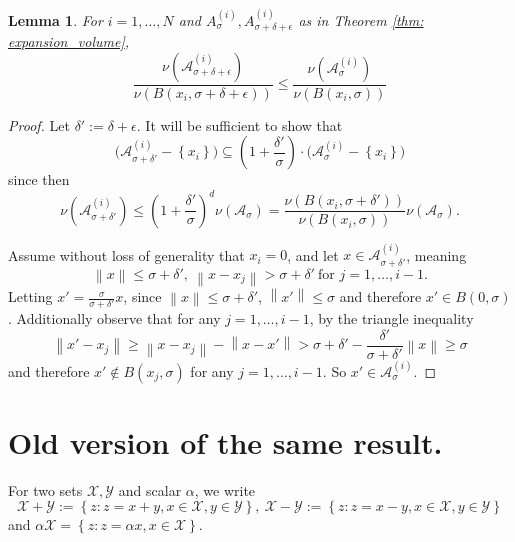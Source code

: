 \documentclass{article}
\newcommand{\norm}[1]{\left\lVert#1\right\rVert}
\newcommand{\set}[1]{\left\{#1\right\}}
\newcommand{\Aset}{\mathcal{A}}
\newcommand{\Asig}{\Aset_{\sigma}}
\newcommand{\1}{\mathbf{1}}
\theoremstyle{alden}
\theoremstyle{aldenthm}
\newtheorem{lemma}{Lemma}
\theoremstyle{remark}
\begin{document}
\begin{lemma}
	\label{lem: covering}
	For $i = 1, \ldots, N$ and  $A_{\sigma}^{(i)}, A_{\sigma + \delta + \epsilon}^{(i)}$ as in Theorem \ref{thm: expansion_volume},
	\begin{equation*}
	\frac{\nu(\Aset_{\sigma + \delta + \epsilon}^{(i)})}{\nu(B(x_i, \sigma + \delta + \epsilon))} \leq \frac{\nu(\Aset_{\sigma}^{(i)})}{\nu(B(x_i, \sigma))}
	\end{equation*}
\end{lemma}
\begin{proof}
	Let $\delta' := \delta + \epsilon$. It will be sufficient to show that
	\begin{equation*}
	\biggl(\Aset_{\sigma + \delta'}^{(i)} - \set{x_i}\biggr) \subseteq \left(1 + \frac{\delta'}{\sigma}\right)\cdot\biggl(\Asig^{(i)} - \set{x_i}\biggr) 
	\end{equation*}
	since then
	\begin{equation*}
	\nu(\Aset_{\sigma + \delta'}^{(i)}) \leq \left(1 + \frac{\delta'}{\sigma}\right)^d \nu(\Aset_{\sigma}) = \frac{\nu(B(x_i, \sigma + \delta'))}{\nu(B(x_i, \sigma))} \nu(\Aset_{\sigma}).
	\end{equation*}
	
	Assume without loss of generality that $x_i = 0$, and let $x \in \Aset_{\sigma + \delta'}^{(i)}$, meaning
	\begin{equation}
	\norm{x} \leq \sigma + \delta',~ \norm{x - x_j} > \sigma + \delta'~ \textrm{for $j = 1, \ldots, i - 1$}.
	\end{equation}
	Letting $x' = \frac{\sigma}{\sigma + \delta'} x$, since $\norm{x} \leq \sigma + \delta'$, $\norm{x'} \leq \sigma$ and therefore $x' \in B(0,\sigma)$. Additionally observe that for any $j = 1, \ldots, i - 1$, by the triangle inequality
	\begin{equation*}
	\norm{x' - x_j} \geq \norm{x - x_j} - \norm{x - x'} > \sigma + \delta' - \frac{\delta'}{\sigma + \delta'}\norm{x} \geq \sigma
	\end{equation*}
	and therefore $x' \not\in B(x_j,\sigma)$ for any $j = 1,\ldots, i - 1$. So $x' \in \Asig^{(i)}$.
\end{proof}

\section{Old version of the same result.}

For two sets $\mathcal{X},\mathcal{Y}$ and scalar $\alpha$, we write 
\begin{equation*}
\mathcal{X} + \mathcal{Y} := \set{z: z = x + y, x \in \mathcal{X}, y \in \mathcal{Y}},~ \mathcal{X} - \mathcal{Y} := \set{z: z = x - y, x \in \mathcal{X}, y \in \mathcal{Y}}
\end{equation*}
and $\alpha \mathcal{X} = \set{z: z = \alpha x, x \in \mathcal{X}}$. 
\end{document}
